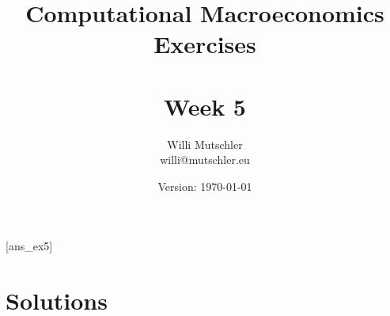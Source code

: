 
\newif\ifDisplaySolutions\DisplaySolutionstrue


\title{Computational Macroeconomics\\Exercises\\~\\Week 5}
\author{Willi Mutschler\\willi@mutschler.eu}
\date{Version: \today}
\maketitle\thispagestyle{empty}

\newpage
{}[ans_ex5]
\tableofcontents\thispagestyle{empty}\newpage

\setcounter{page}{1}
\newpage
\newpage
\newpage

\printbibliography
{}
\ifDisplaySolutions
\newpage
\appendix
\section{Solutions}

\fi
